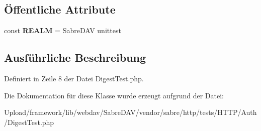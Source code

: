 \subsection*{Öffentliche Attribute}
\begin{DoxyCompactItemize}
\item 
\mbox{\label{class_sabre_1_1_h_t_t_p_1_1_auth_1_1_digest_test_a26b0f3514eb2876a89377a202e0b6b41}} 
const {\bfseries R\+E\+A\+LM} = \textquotesingle{}Sabre\+D\+AV unittest\textquotesingle{}
\end{DoxyCompactItemize}


\subsection{Ausführliche Beschreibung}


Definiert in Zeile 8 der Datei Digest\+Test.\+php.



Die Dokumentation für diese Klasse wurde erzeugt aufgrund der Datei\+:\begin{DoxyCompactItemize}
\item 
Upload/framework/lib/webdav/\+Sabre\+D\+A\+V/vendor/sabre/http/tests/\+H\+T\+T\+P/\+Auth/Digest\+Test.\+php\end{DoxyCompactItemize}
